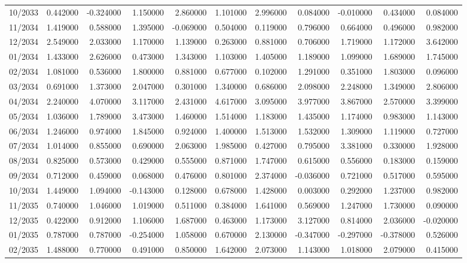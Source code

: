 \begin{tabular}{lrrrrrrrrrr}
10/2033 & 0.442000 & -0.324000 & 1.150000 & 2.860000 & 1.101000 & 2.996000 & 0.084000 & -0.010000 & 0.434000 & 0.084000 \\
11/2034 & 1.419000 & 0.588000 & 1.395000 & -0.069000 & 0.504000 & 0.119000 & 0.796000 & 0.664000 & 0.496000 & 0.982000 \\
12/2034 & 2.549000 & 2.033000 & 1.170000 & 1.139000 & 0.263000 & 0.881000 & 0.706000 & 1.719000 & 1.172000 & 3.642000 \\
01/2034 & 1.433000 & 2.626000 & 0.473000 & 1.343000 & 1.103000 & 1.405000 & 1.189000 & 1.099000 & 1.689000 & 1.745000 \\
02/2034 & 1.081000 & 0.536000 & 1.800000 & 0.881000 & 0.677000 & 0.102000 & 1.291000 & 0.351000 & 1.803000 & 0.096000 \\
03/2034 & 0.691000 & 1.373000 & 2.047000 & 0.301000 & 1.340000 & 0.686000 & 2.098000 & 2.248000 & 1.349000 & 2.806000 \\
04/2034 & 2.240000 & 4.070000 & 3.117000 & 2.431000 & 4.617000 & 3.095000 & 3.977000 & 3.867000 & 2.570000 & 3.399000 \\
05/2034 & 1.036000 & 1.789000 & 3.473000 & 1.460000 & 1.514000 & 1.183000 & 1.435000 & 1.174000 & 0.983000 & 1.143000 \\
06/2034 & 1.246000 & 0.974000 & 1.845000 & 0.924000 & 1.400000 & 1.513000 & 1.532000 & 1.309000 & 1.119000 & 0.727000 \\
07/2034 & 1.014000 & 0.855000 & 0.690000 & 2.063000 & 1.985000 & 0.427000 & 0.795000 & 3.381000 & 0.330000 & 1.928000 \\
08/2034 & 0.825000 & 0.573000 & 0.429000 & 0.555000 & 0.871000 & 1.747000 & 0.615000 & 0.556000 & 0.183000 & 0.159000 \\
09/2034 & 0.712000 & 0.459000 & 0.068000 & 0.476000 & 0.801000 & 2.374000 & -0.036000 & 0.721000 & 0.517000 & 0.595000 \\
10/2034 & 1.449000 & 1.094000 & -0.143000 & 0.128000 & 0.678000 & 1.428000 & 0.003000 & 0.292000 & 1.237000 & 0.982000 \\
11/2035 & 0.740000 & 1.046000 & 1.019000 & 0.511000 & 0.384000 & 1.641000 & 0.569000 & 1.247000 & 1.730000 & 0.090000 \\
12/2035 & 0.422000 & 0.912000 & 1.106000 & 1.687000 & 0.463000 & 1.173000 & 3.127000 & 0.814000 & 2.036000 & -0.020000 \\
01/2035 & 0.787000 & 0.787000 & -0.254000 & 1.058000 & 0.670000 & 2.130000 & -0.347000 & -0.297000 & -0.378000 & 0.526000 \\
02/2035 & 1.488000 & 0.770000 & 0.491000 & 0.850000 & 1.642000 & 2.073000 & 1.143000 & 1.018000 & 2.079000 & 0.415000 \\

\end{tabular}
